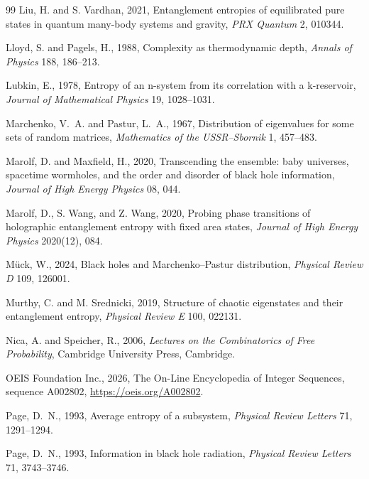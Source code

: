 \documentclass[11pt,letterpaper]{article}
\theoremstyle{plain}
\theoremstyle{definition}
\theoremstyle{remark}
\begin{document}
\begin{thebibliography}{99}
Liu, H. and S. Vardhan, 2021, Entanglement entropies of equilibrated pure states in quantum many-body systems and gravity, \textit{PRX Quantum} 2, 010344.

Lloyd, S. and Pagels, H., 1988, Complexity as thermodynamic depth, \textit{Annals of Physics} 188, 186--213.

Lubkin, E., 1978, Entropy of an n-system from its correlation with a k-reservoir, \textit{Journal of Mathematical Physics} 19, 1028--1031.

Marchenko, V.~A. and Pastur, L.~A., 1967, Distribution of eigenvalues for some sets of random matrices, \textit{Mathematics of the USSR--Sbornik} 1, 457--483.

Marolf, D. and Maxfield, H., 2020, Transcending the ensemble: baby universes, spacetime wormholes, and the order and disorder of black hole information, \textit{Journal of High Energy Physics} 08, 044.


Marolf, D., S. Wang, and Z. Wang, 2020, Probing phase transitions of holographic entanglement entropy with fixed area states, \textit{Journal of High Energy Physics} 2020(12), 084.

M\"uck, W., 2024, Black holes and Marchenko--Pastur distribution, \textit{Physical Review D} 109, 126001.

Murthy, C. and M. Srednicki, 2019, Structure of chaotic eigenstates and their entanglement entropy, \textit{Physical Review E} 100, 022131.

Nica, A. and Speicher, R., 2006, \textit{Lectures on the Combinatorics of Free Probability}, Cambridge University Press, Cambridge.

OEIS Foundation Inc., 2026, The On-Line Encyclopedia of Integer Sequences, sequence A002802, \url{https://oeis.org/A002802}.

Page, D.~N., 1993, Average entropy of a subsystem, \textit{Physical Review Letters} 71, 1291--1294.

Page, D.~N., 1993, Information in black hole radiation, \textit{Physical Review Letters} 71, 3743--3746.


\end{thebibliography}
\end{document}
